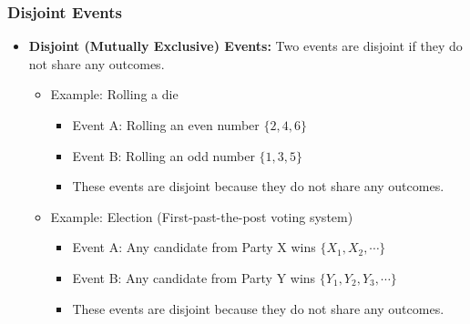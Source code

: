 \documentclass[handout]{beamer} %
\begin{document}
\begin{frame}
    \frametitle{Disjoint Events}
    \begin{itemize}
        \item \textbf{Disjoint (Mutually Exclusive) Events:} Two events are disjoint if they do not share any outcomes.
        \pause
        \begin{itemize}
            \item Example: Rolling a die \pause
            \begin{itemize}
                \item Event A: Rolling an even number $\{2, 4, 6\}$ \pause
                \item Event B: Rolling an odd number $\{1, 3, 5\}$ \pause
                \item These events are disjoint because they do not share any outcomes. \pause
            \end{itemize}
            \pause
            \item Example: Election (First-past-the-post voting system) \pause
            \begin{itemize}
                \item Event A: Any candidate from Party X wins $\{X_1, X_2, \cdots\}$ \pause
                \item Event B: Any candidate from Party Y wins $\{Y_1, Y_2, Y_3, \cdots\}$ \pause
                \item These events are disjoint because they do not share any outcomes. 
            \end{itemize}
        \end{itemize}
    \end{itemize}
\end{frame}
\end{document}
